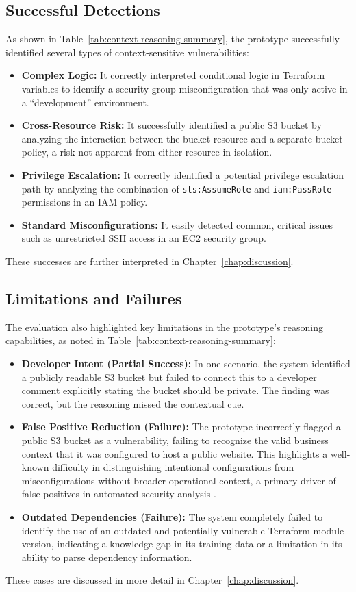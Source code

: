 \subsection{Successful Detections}
As shown in Table~\ref{tab:context-reasoning-summary}, the prototype successfully identified several types of context-sensitive vulnerabilities:
\begin{itemize}
    \item \textbf{Complex Logic:} It correctly interpreted conditional logic in Terraform variables to identify a security group misconfiguration that was only active in a ``development'' environment.
    \item \textbf{Cross-Resource Risk:} It successfully identified a public S3 bucket by analyzing the interaction between the bucket resource and a separate bucket policy, a risk not apparent from either resource in isolation.
    \item \textbf{Privilege Escalation:} It correctly identified a potential privilege escalation path by analyzing the combination of \texttt{sts:AssumeRole} and \texttt{iam:PassRole} permissions in an IAM policy.
    \item \textbf{Standard Misconfigurations:} It easily detected common, critical issues such as unrestricted SSH access in an EC2 security group.
\end{itemize}
These successes are further interpreted in Chapter~\ref{chap:discussion}.

\subsection{Limitations and Failures}
The evaluation also highlighted key limitations in the prototype's reasoning capabilities, as noted in Table~\ref{tab:context-reasoning-summary}:
\begin{itemize}
    \item \textbf{Developer Intent (Partial Success):} In one scenario, the system identified a publicly readable S3 bucket but failed to connect this to a developer comment explicitly stating the bucket should be private. The finding was correct, but the reasoning missed the contextual cue.
    \item \textbf{False Positive Reduction (Failure):} The prototype incorrectly flagged a public S3 bucket as a vulnerability, failing to recognize the valid business context that it was configured to host a public website. This highlights a well-known difficulty in distinguishing intentional configurations from misconfigurations without broader operational context, a primary driver of false positives in automated security analysis \cite{zheng_context-aware_2023}.
    \item \textbf{Outdated Dependencies (Failure):} The system completely failed to identify the use of an outdated and potentially vulnerable Terraform module version, indicating a knowledge gap in its training data or a limitation in its ability to parse dependency information.
\end{itemize}
These cases are discussed in more detail in Chapter~\ref{chap:discussion}.

